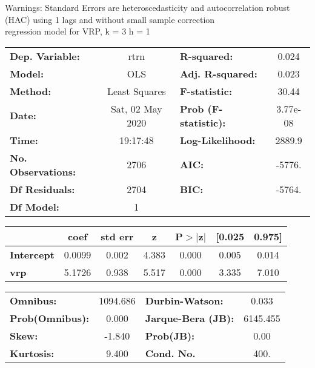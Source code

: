 Warnings: \newline
 [1] Standard Errors are heteroscedasticity and autocorrelation robust (HAC) using 1 lags and without small sample correction\\ 

regression model for VRP, k = 3 h = 1\begin{center}
\begin{tabular}{lclc}
\toprule
\textbf{Dep. Variable:}    &       rtrn       & \textbf{  R-squared:         } &     0.024   \\
\textbf{Model:}            &       OLS        & \textbf{  Adj. R-squared:    } &     0.023   \\
\textbf{Method:}           &  Least Squares   & \textbf{  F-statistic:       } &     30.44   \\
\textbf{Date:}             & Sat, 02 May 2020 & \textbf{  Prob (F-statistic):} &  3.77e-08   \\
\textbf{Time:}             &     19:17:48     & \textbf{  Log-Likelihood:    } &    2889.9   \\
\textbf{No. Observations:} &        2706      & \textbf{  AIC:               } &    -5776.   \\
\textbf{Df Residuals:}     &        2704      & \textbf{  BIC:               } &    -5764.   \\
\textbf{Df Model:}         &           1      & \textbf{                     } &             \\
\bottomrule
\end{tabular}
\begin{tabular}{lcccccc}
                   & \textbf{coef} & \textbf{std err} & \textbf{z} & \textbf{P$> |$z$|$} & \textbf{[0.025} & \textbf{0.975]}  \\
\midrule
\textbf{Intercept} &       0.0099  &        0.002     &     4.383  &         0.000        &        0.005    &        0.014     \\
\textbf{vrp}       &       5.1726  &        0.938     &     5.517  &         0.000        &        3.335    &        7.010     \\
\bottomrule
\end{tabular}
\begin{tabular}{lclc}
\textbf{Omnibus:}       & 1094.686 & \textbf{  Durbin-Watson:     } &    0.033  \\
\textbf{Prob(Omnibus):} &   0.000  & \textbf{  Jarque-Bera (JB):  } & 6145.455  \\
\textbf{Skew:}          &  -1.840  & \textbf{  Prob(JB):          } &     0.00  \\
\textbf{Kurtosis:}      &   9.400  & \textbf{  Cond. No.          } &     400.  \\
\bottomrule
\end{tabular}
\end{center}

